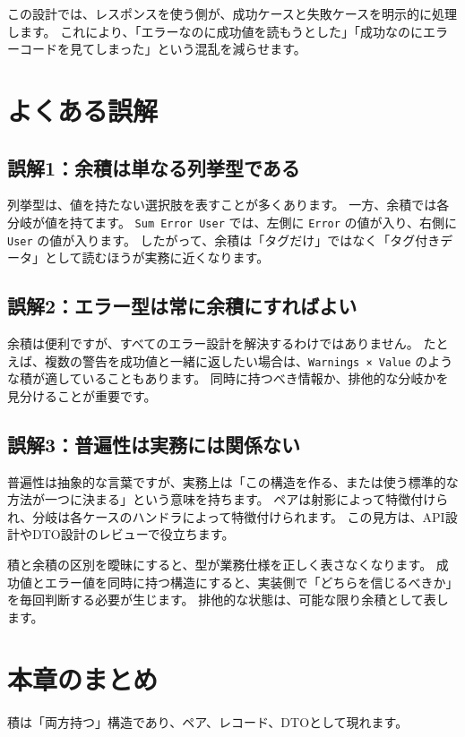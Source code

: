 この設計では、レスポンスを使う側が、成功ケースと失敗ケースを明示的に処理します。
これにより、「エラーなのに成功値を読もうとした」「成功なのにエラーコードを見てしまった」という混乱を減らせます。

\section{よくある誤解}

\subsection{誤解1：余積は単なる列挙型である}

列挙型は、値を持たない選択肢を表すことが多くあります。
一方、余積では各分岐が値を持てます。
\texttt{Sum Error User} では、左側に \texttt{Error} の値が入り、右側に \texttt{User} の値が入ります。
したがって、余積は「タグだけ」ではなく「タグ付きデータ」として読むほうが実務に近くなります。

\subsection{誤解2：エラー型は常に余積にすればよい}

余積は便利ですが、すべてのエラー設計を解決するわけではありません。
たとえば、複数の警告を成功値と一緒に返したい場合は、\texttt{Warnings × Value} のような積が適していることもあります。
同時に持つべき情報か、排他的な分岐かを見分けることが重要です。

\subsection{誤解3：普遍性は実務には関係ない}

普遍性は抽象的な言葉ですが、実務上は「この構造を作る、または使う標準的な方法が一つに決まる」という意味を持ちます。
ペアは射影によって特徴付けられ、分岐は各ケースのハンドラによって特徴付けられます。
この見方は、API設計やDTO設計のレビューで役立ちます。

積と余積の区別を曖昧にすると、型が業務仕様を正しく表さなくなります。
成功値とエラー値を同時に持つ構造にすると、実装側で「どちらを信じるべきか」を毎回判断する必要が生じます。
排他的な状態は、可能な限り余積として表します。

\section{本章のまとめ}

積は「両方持つ」構造であり、ペア、レコード、DTOとして現れます。

